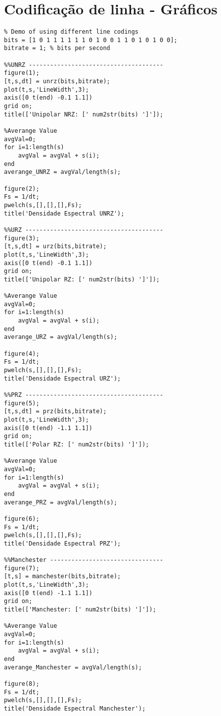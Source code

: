 \section{Codificação de linha - Gráficos}
\begin{lstlisting}
% Demo of using different line codings
bits = [1 0 1 1 1 1 1 1 0 1 0 0 1 1 0 1 0 1 0 0];
bitrate = 1; % bits per second

%%UNRZ --------------------------------------
figure(1);
[t,s,dt] = unrz(bits,bitrate);
plot(t,s,'LineWidth',3);
axis([0 t(end) -0.1 1.1])
grid on;
title(['Unipolar NRZ: [' num2str(bits) ']']);

%Averange Value
avgVal=0;
for i=1:length(s)
    avgVal = avgVal + s(i);
end
averange_UNRZ = avgVal/length(s);

figure(2);
Fs = 1/dt;
pwelch(s,[],[],[],Fs);
title('Densidade Espectral UNRZ');

%%URZ ---------------------------------------
figure(3);
[t,s,dt] = urz(bits,bitrate);
plot(t,s,'LineWidth',3);
axis([0 t(end) -0.1 1.1])
grid on;
title(['Unipolar RZ: [' num2str(bits) ']']);

%Averange Value
avgVal=0;
for i=1:length(s)
    avgVal = avgVal + s(i);
end
averange_URZ = avgVal/length(s);

figure(4);
Fs = 1/dt;
pwelch(s,[],[],[],Fs);
title('Densidade Espectral URZ');

%%PRZ ---------------------------------------
figure(5);
[t,s,dt] = prz(bits,bitrate);
plot(t,s,'LineWidth',3);
axis([0 t(end) -1.1 1.1])
grid on;
title(['Polar RZ: [' num2str(bits) ']']);

%Averange Value
avgVal=0;
for i=1:length(s)
    avgVal = avgVal + s(i);
end
averange_PRZ = avgVal/length(s);

figure(6);
Fs = 1/dt;
pwelch(s,[],[],[],Fs);
title('Densidade Espectral PRZ');

%%Manchester --------------------------------
figure(7);
[t,s] = manchester(bits,bitrate);
plot(t,s,'LineWidth',3);
axis([0 t(end) -1.1 1.1])
grid on;
title(['Manchester: [' num2str(bits) ']']);

%Averange Value
avgVal=0;
for i=1:length(s)
    avgVal = avgVal + s(i);
end
averange_Manchester = avgVal/length(s);

figure(8);
Fs = 1/dt;
pwelch(s,[],[],[],Fs);
title('Densidade Espectral Manchester');
\end{lstlisting}
